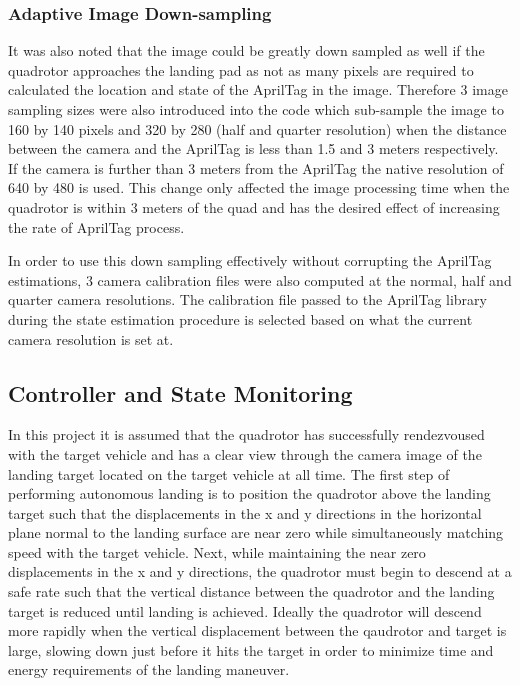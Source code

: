 \documentclass[11pt, twocolumn]{article}
\begin{document}
\subsubsection{Adaptive Image Down-sampling}
It was also noted that the image could be greatly down sampled as well if the quadrotor approaches the landing pad as not as many pixels are required to calculated the location and state of the AprilTag in the image. Therefore 3 image sampling sizes were also introduced into the code which sub-sample the image to 160 by 140 pixels and 320 by 280 (half and quarter resolution) when the distance between the camera and the AprilTag is less than 1.5 and 3 meters respectively. If the camera is further than 3 meters from the AprilTag the native resolution of 640 by 480 is used. This change only affected the image processing time when the quadrotor is within 3 meters of the quad and has the desired effect of increasing the rate of AprilTag process.

In order to use this down sampling effectively without corrupting the AprilTag estimations, 3 camera calibration files were also computed at the normal, half and quarter camera resolutions. The calibration file passed to the AprilTag library during the state estimation procedure is selected based on what the current camera resolution is set at. 

\subsection{Controller and State Monitoring}
In this project it is assumed that the quadrotor has successfully rendezvoused with the target vehicle and has a clear view through the camera image of the landing target located on the target vehicle at all time. The first step of performing  autonomous landing is to position the quadrotor above the landing target such that the displacements in the x and y directions in the horizontal plane normal to the landing surface are near zero while simultaneously matching speed with the target vehicle. Next, while maintaining the near zero displacements in the x and y directions, the quadrotor must begin to descend at a safe rate such that the vertical distance between the quadrotor and the landing target is reduced until landing is achieved. Ideally the quadrotor will descend more rapidly when the vertical displacement between the qaudrotor and target is large, slowing down just before it hits the target in order to minimize time and energy requirements of the landing maneuver. 
\end{document}
